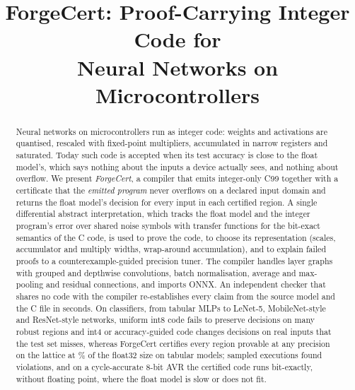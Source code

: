\documentclass[conference]{IEEEtran}
\begin{document}
\title{ForgeCert: Proof-Carrying Integer Code for\\Neural Networks on Microcontrollers}

\author{
}

\maketitle

\begin{abstract}
Neural networks on microcontrollers run as integer code: weights and activations are quantised, rescaled with fixed-point multipliers, accumulated in narrow registers and saturated. Today such code is accepted when its test accuracy is close to the float model's, which says nothing about the inputs a device actually sees, and nothing about overflow. We present \emph{ForgeCert}, a compiler that emits integer-only C99 together with a certificate that the \emph{emitted program} never overflows on a declared input domain and returns the float model's decision for every input in each certified region. A single differential abstract interpretation, which tracks the float model and the integer program's error over shared noise symbols with transfer functions for the bit-exact semantics of the C code, is used to prove the code, to choose its representation (scales, accumulator and multiply widths, wrap-around accumulation), and to explain failed proofs to a counterexample-guided precision tuner. The compiler handles layer graphs with grouped and depthwise convolutions, batch normalisation, average and max-pooling and residual connections, and imports ONNX. An independent checker that shares no code with the compiler re-establishes every claim from the source model and the C file in seconds. On \FCModels{} classifiers, from tabular MLPs to LeNet-5, MobileNet-style and ResNet-style networks, uniform int8 code fails to preserve decisions on many robust regions and int4 or accuracy-guided code changes decisions on real inputs that the test set misses, whereas ForgeCert certifies every region provable at any precision on the lattice at \FCTabularForgecertFlash\% of the float32 size on tabular models; \FCAuditSamples{} sampled executions found \FCAuditViolations{} violations, and on a cycle-accurate 8-bit AVR the certified code runs bit-exactly, without floating point, where the float model is slow or does not fit.
\end{abstract}
\end{document}

